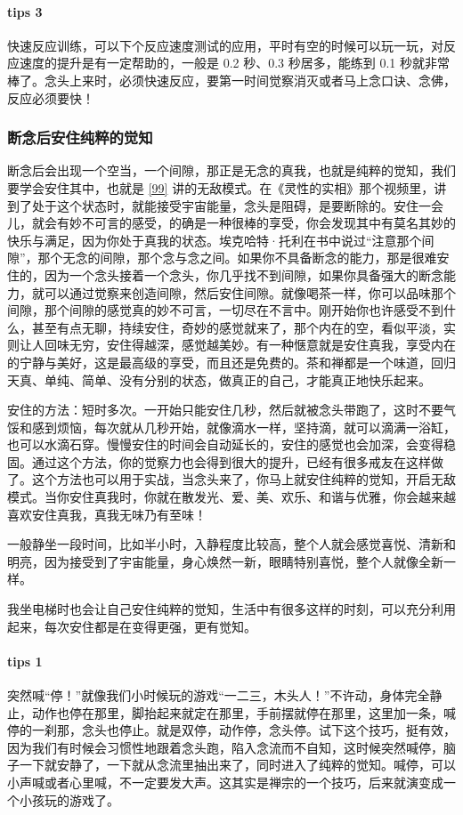 \paragraph{tips 3} 快速反应训练，可以下个反应速度测试的应用，平时有空的时候可以玩一玩，对反应速度的提升是有一定帮助的，一般是 0.2 秒、0.3 秒居多，能练到 0.1 秒就非常棒了。念头上来时，必须快速反应，要第一时间觉察消灭或者马上念口诀、念佛，反应必须要快！

\subsubsection{断念后安住纯粹的觉知}

断念后会出现一个空当，一个间隙，那正是无念的真我，也就是纯粹的觉知，我们要学会安住其中，也就是 \ref{99} 讲的无敌模式。在《灵性的实相》那个视频里，讲到了处于这个状态时，就能接受宇宙能量，念头是阻碍，是要断除的。安住一会儿，就会有妙不可言的感受，的确是一种很棒的享受，你会发现其中有莫名其妙的快乐与满足，因为你处于真我的状态。埃克哈特·托利在书中说过“注意那个间隙”，那个无念的间隙，那个念与念之间。如果你不具备断念的能力，那是很难安住的，因为一个念头接着一个念头，你几乎找不到间隙，如果你具备强大的断念能力，就可以通过觉察来创造间隙，然后安住间隙。就像喝茶一样，你可以品味那个间隙，那个间隙的感觉真的妙不可言，一切尽在不言中。刚开始你也许感受不到什么，甚至有点无聊，持续安住，奇妙的感觉就来了，那个内在的空，看似平淡，实则让人回味无穷，安住得越深，感觉越美妙。有一种惬意就是安住真我，享受内在的宁静与美好，这是最高级的享受，而且还是免费的。茶和禅都是一个味道，回归天真、单纯、简单、没有分别的状态，做真正的自己，才能真正地快乐起来。

安住的方法：短时多次。一开始只能安住几秒，然后就被念头带跑了，这时不要气馁和感到烦恼，每次就从几秒开始，就像滴水一样，坚持滴，就可以滴满一浴缸，也可以水滴石穿。慢慢安住的时间会自动延长的，安住的感觉也会加深，会变得稳固。通过这个方法，你的觉察力也会得到很大的提升，已经有很多戒友在这样做了。这个方法也可以用于实战，当念头来了，你马上就安住纯粹的觉知，开启无敌模式。当你安住真我时，你就在散发光、爱、美、欢乐、和谐与优雅，你会越来越喜欢安住真我，真我无味乃有至味！

一般静坐一段时间，比如半小时，入静程度比较高，整个人就会感觉喜悦、清新和明亮，因为接受到了宇宙能量，身心焕然一新，眼睛特别喜悦，整个人就像全新一样。

我坐电梯时也会让自己安住纯粹的觉知，生活中有很多这样的时刻，可以充分利用起来，每次安住都是在变得更强，更有觉知。

\paragraph{tips 1} 突然喊“停！”就像我们小时候玩的游戏“一二三，木头人！”不许动，身体完全静止，动作也停在那里，脚抬起来就定在那里，手前摆就停在那里，这里加一条，喊停的一刹那，念头也停止。就是双停，动作停，念头停。试下这个技巧，挺有效，因为我们有时候会习惯性地跟着念头跑，陷入念流而不自知，这时候突然喊停，脑子一下就安静了，一下就从念流里抽出来了，同时进入了纯粹的觉知。喊停，可以小声喊或者心里喊，不一定要发大声。这其实是禅宗的一个技巧，后来就演变成一个小孩玩的游戏了。

